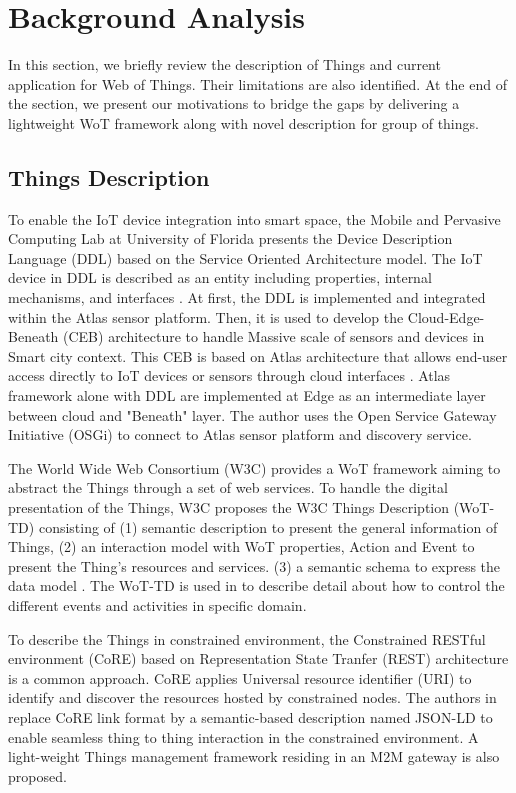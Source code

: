 \section{Background Analysis}


In this section, we briefly review the description of Things and current application for Web of Things. Their limitations are also identified. At the end of the section, we present our motivations to bridge the gaps by delivering a lightweight WoT framework along with novel description for group of things.
\subsection{Things Description}
To enable the IoT device integration into smart space, the Mobile and Pervasive Computing Lab at University of Florida presents the Device Description Language (DDL) based on the Service Oriented Architecture model. The IoT device in DDL is described as an entity including properties, internal mechanisms, and interfaces  \cite{chen2009device}. At first, the DDL is implemented and integrated within the Atlas sensor platform. Then, it is used to develop the Cloud-Edge-Beneath (CEB) architecture \cite{xu2016scalable} to handle Massive scale of sensors and devices in Smart city context. This CEB is based on Atlas architecture that allows end-user access directly to IoT devices or sensors through cloud interfaces \cite{bose2006building}\cite{chen2009atlas}. Atlas framework alone with DDL are implemented at Edge as an intermediate layer between cloud and "Beneath" layer. The author uses the Open Service Gateway Initiative (OSGi) to connect to Atlas sensor platform and discovery service. 

The World Wide Web Consortium (W3C) provides a WoT framework aiming to abstract the Things through a set of web services. To handle the digital presentation of the Things, W3C proposes the W3C Things Description (WoT-TD) consisting of (1) semantic description to present the general information of Things, (2) an interaction model with WoT properties, Action and Event to present the Thing's resources and services. (3) a semantic schema to express the data model \cite{W3C_TD}. The WoT-TD is used in \cite{kaebisch2016thing} to describe detail about how to control the different events and activities in specific domain.

To describe the Things in constrained environment, the Constrained RESTful environment (CoRE) based on Representation State Tranfer (REST) architecture is a common approach. CoRE applies Universal resource identifier (URI) to identify and discover the resources hosted by constrained nodes. The authors in \cite{7520965} replace CoRE link format by a semantic-based description named JSON-LD to enable seamless thing to thing interaction in the constrained environment.  A light-weight Things management framework residing in an M2M gateway is also proposed.

